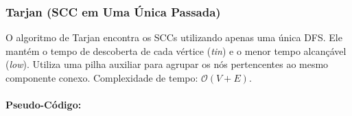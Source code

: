 \subsubsection{Tarjan (SCC em Uma Única Passada)}
O algoritmo de Tarjan encontra os SCCs utilizando apenas uma única DFS. Ele
mantém o tempo de descoberta de cada vértice (\textit{tin}) e o menor tempo
alcançável (\textit{low}). Utiliza uma pilha auxiliar para agrupar os nós
pertencentes ao mesmo componente conexo. Complexidade de tempo: $\mathcal{O}(V
    + E)$.

\paragraph{Pseudo-Código: }\mbox{}\\
\begin{algorithm}[H]
    \SetAlgoLined

    \caption{Algoritmo de Tarjan para SCC}
\end{algorithm}

